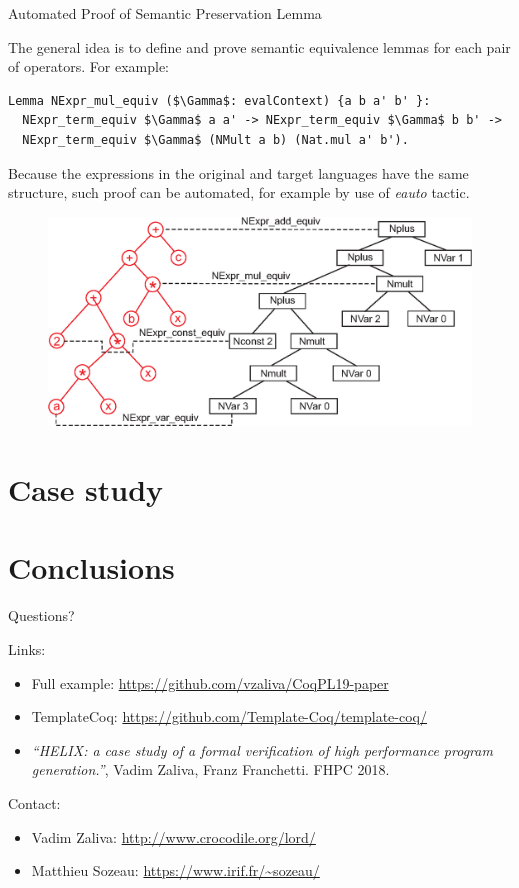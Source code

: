 \documentclass[aspectratio=169]{beamer}
\begin{document}
\begin{frame}[fragile]{Automated Proof of Semantic Preservation Lemma}

  The general idea is to define and prove semantic
  equivalence lemmas for each pair of operators. For example:

  \begin{lstlisting}[language=Coq, mathescape=true,frame=single, basicstyle=\footnotesize]
Lemma NExpr_mul_equiv ($\Gamma$: evalContext) {a b a' b' }:
  NExpr_term_equiv $\Gamma$ a a' -> NExpr_term_equiv $\Gamma$ b b' ->
  NExpr_term_equiv $\Gamma$ (NMult a b) (Nat.mul a' b').
\end{lstlisting}

Because the expressions in the original and target languages have the
same structure, such proof can be automated, for example by use of
\emph{eauto} tactic.
  
  \begin{figure}[h]
    \includegraphics[width=0.5\columnwidth]{figures/trees.eps}
  \end{figure}

\end{frame}


\section{Case study}
\section{Conclusions}
  
\begin{frame}[fragile]{Questions?}

  Links:
  
  \begin{itemize}
  \item Full example: \url{https://github.com/vzaliva/CoqPL19-paper}
  \item TemplateCoq:
    \url{https://github.com/Template-Coq/template-coq/}
  \item \textit{``HELIX: a case
    study of a formal verification of high performance program
    generation.''}, Vadim Zaliva, Franz Franchetti. FHPC 2018. 
  \end{itemize}

  Contact:

  \begin{itemize}
  \item Vadim Zaliva: \url{http://www.crocodile.org/lord/}
  \item Matthieu Sozeau: \url{https://www.irif.fr/~sozeau/}
  \end{itemize}  
  
\end{frame}
\end{document}
